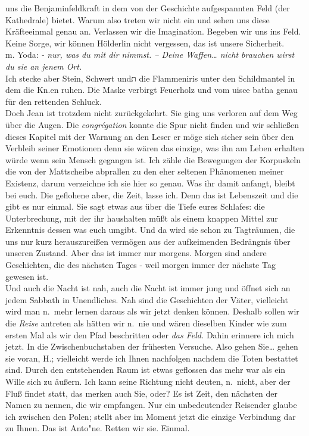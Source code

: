 \documentclass[
]{article}
\begin{document}
uns die Benjaminfeldkraft in dem von der Geschichte aufgespannten Feld
(der Kathedrale) bietet. Warum also treten wir nicht ein und sehen uns
diese Kräfteeinmal genau an. Verlassen wir die Imagination. Begeben wir
uns ins Feld. Keine Sorge, wir können Hölderlin nicht vergessen, das ist
unsere Sicherheit.\\
m. Yoda: \emph{- nur, was du mit dir nimmst. -- Deine Waffen\ldots{}
nicht brauchen wirst du sie an jenem Ort.}\\
Ich stecke aber Stein, Schwert undת die Flammeniris unter den
Schildmantel in dem die Kn.en ruhen. Die Maske verbirgt Feuerholz und
vom uisce batha genau für den rettenden Schluck.\\
Doch Jean ist trotzdem nicht zurückgekehrt. Sie ging uns verloren auf
dem Weg über die Augen. Die \emph{congrégation} konnte die Spur nicht
finden und wir schließen dieses Kapitel mit der Warnung an den Leser er
möge sich sicher sein über den Verbleib seiner Emotionen denn sie wären
das einzige, was ihn am Leben erhalten würde wenn sein Mensch gegangen
ist. Ich zähle die Bewegungen der Korpuskeln die von der Mattscheibe
abprallen zu den eher seltenen Phänomenen meiner Existenz, darum
verzeichne ich sie hier so genau. Was ihr damit anfangt, bleibt bei
euch. Die geflohene aber, die Zeit, lasse ich. Denn das ist Lebenszeit
und die gibt es nur einmal. Sie sagt etwas aus über die Tiefe eures
Schlafes: die Unterbrechung, mit der ihr haushalten müßt als einem
knappen Mittel zur Erkenntnis dessen was euch umgibt. Und da wird sie
schon zu Tagträumen, die uns nur kurz herauszureißen vermögen aus der
aufkeimenden Bedrängnis über unseren Zustand. Aber das ist immer nur
morgens. Morgen sind andere Geschichten, die des nächsten Tages - weil
morgen immer der nächste Tag gewesen ist.\\
Und auch die Nacht ist nah, auch die Nacht ist immer jung und öffnet
sich an jedem Sabbath in Unendliches. Nah sind die Geschichten der
Väter, vielleicht wird man n.~mehr lernen daraus als wir jetzt denken
können. Deshalb sollen wir die \emph{Reise }antreten als hätten wir
n.~nie und wären dieselben Kinder wie zum ersten Mal als wir den Pfad
beschritten oder \emph{das Feld.} Dahin erinnere ich mich jetzt. In die
Zwischenbuchstaben der frühesten Versuche. Also gehen Sie\ldots{} gehen
sie voran, H.; vielleicht werde ich Ihnen nachfolgen nachdem die Toten
bestattet sind. Durch den entstehenden Raum ist etwas geflossen das mehr
war als ein Wille sich zu äußern. Ich kann seine Richtung nicht deuten,
n.~nicht, aber der Fluß findet statt, das merken auch Sie, oder? Es ist
Zeit, den nächsten der Namen zu nennen, die wir empfangen. Nur ein
unbedeutender Reisender glaube ich zwischen den Polen; stellt aber im
Moment jetzt die einzige Verbindung dar zu Ihnen. Das ist Anto"ne.
Retten wir sie. Einmal.
\end{document}
